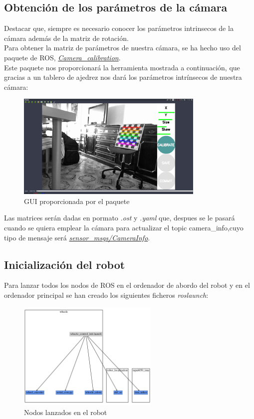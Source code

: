 \subsection{Obtención de los parámetros de la cámara}
Destacar que, siempre es necesario conocer los parámetros intrinsecos de la cámara además de la matriz de rotación. \\
Para obtener la matriz de parámetros de nuestra cámara, se ha hecho uso del paquete de ROS, \textit{\href{http://wiki.ros.org/camera_calibration}{Camera\_calibration}}.\\
Este paquete nos proporcionará la herramienta mostrada a continuación, que gracias a un tablero de ajedrez nos dará los parámetros intrínsecos de nuestra cámara:
\begin{figure}[!ht]
    \centering
    \includegraphics[width=0.8\textwidth]{images/calibration_art}
    \caption{GUI proporcionada por el paquete}
\end{figure}

Las matrices serán dadas en pormato \textit{.ost} y \textit{.yaml} que, despues se le pasará cuando se quiera emplear la cámara para actualizar el topic camera\_info,cuyo 
tipo de mensaje será \textit{\href{http://docs.ros.org/melodic/api/sensor_msgs/html/msg/CameraInfo.html}{sensor\_msgs/CameraInfo}}.\\

\newpage
\subsection{Inicialización del robot}
Para lanzar todos los nodos de ROS en el ordenador de abordo del robot y en el ordenador principal se han creado los siguientes ficheros \textit{roslaunch}:
    \begin{figure}[!ht]
        \centering
        \includegraphics[width=0.6\textwidth]{images/whee}
        \caption{Nodos lanzados en el robot}
    \end{figure}


